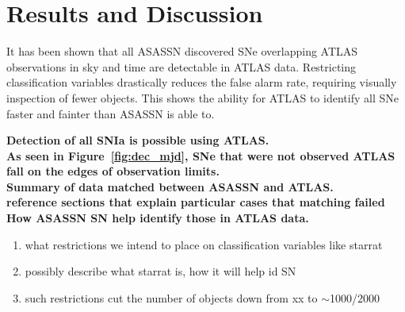 \documentclass[aps,prb,twocolumn,superscriptaddress]{revtex4-1}
\begin{document}
\section{Results and Discussion}
\indent It has been shown that all ASASSN discovered SNe overlapping ATLAS 
observations in sky and time are detectable in ATLAS data. Restricting 
classification variables drastically reduces the false alarm rate, requiring 
visually inspection of fewer objects. This shows the ability for ATLAS to 
identify all SNe faster and fainter than ASASSN is able to.

{\bf Detection of all SNIa is possible using ATLAS.\\}
{\bf As seen in Figure~\ref{fig:dec_mjd}, SNe that were not 
observed ATLAS fall on the edges of observation limits.\\}
{\bf Summary of data matched between ASASSN and ATLAS.\\
reference sections that explain particular cases that matching failed}
{\bf How ASASSN SN help identify those in ATLAS data.}
\begin{enumerate}
	\item{} what restrictions we intend to place on classification variables like starrat
	\item{} possibly describe what starrat is, how it will help id SN
	\item{} such restrictions cut the number of objects down from xx to $\sim$1000/2000
\end{enumerate}
\end{document}
